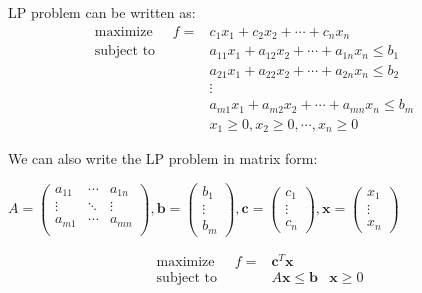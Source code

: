 \documentclass[9pt]{article}
\begin{document}
\vspace{-9pt}
\begin{multicols}{2}

    LP problem can be written as:
    \[
    \begin{aligned}
        \text{maximize} \quad \ \ f = & c_1x_1 + c_2x_2 + \cdots + c_nx_n & \\
        \text{subject to} \quad \qquad & a_{11}x_1 + a_{12}x_2 + \cdots + a_{1n}x_n \leq b_1 & \\
                                & a_{21}x_1 + a_{22}x_2 + \cdots + a_{2n}x_n \leq b_2 & \\
                                & \vdots & \\
                                & a_{m1}x_1 + a_{m2}x_2 + \cdots + a_{mn}x_n \leq b_m & \\
                                & x_1 \geq 0, x_2 \geq 0, \cdots, x_n \geq 0 &
    \end{aligned}
    \]
    
    \columnbreak

    We can also write the LP problem in matrix form:

    \vspace{5pt}
    $
    A=
    \begin{pmatrix}
        a_{11} & \cdots & a_{1n} \\
        \vdots & \ddots & \vdots \\
        a_{m1} & \cdots & a_{mn} \\
    \end{pmatrix}
    ,\mathbf{b}=
    \begin{pmatrix}
        b_1 \\
        \vdots \\
        b_m
    \end{pmatrix}
    ,\mathbf{c}=
    \begin{pmatrix}
        c_1 \\
        \vdots \\
        c_n
    \end{pmatrix}
    ,\mathbf{x}=
    \begin{pmatrix}
        x_1 \\
        \vdots \\
        x_n
    \end{pmatrix}
    $

    \[
    \begin{aligned}
        \text{maximize} \quad \ \ f = & \mathbf{c}^T\mathbf{x} & \\
        \text{subject to} \quad \qquad & A\mathbf{x} \leq \mathbf{b} & \mathbf{x} \geq 0 \\
    \end{aligned}
    \]
\end{multicols}
\vspace{-9pt}
\end{document}
